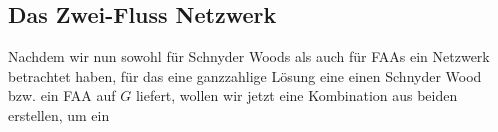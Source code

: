 

\subsection{Das Zwei-Fluss Netzwerk}

Nachdem wir nun sowohl für Schnyder Woods als auch für FAAs ein Netzwerk betrachtet haben, für das eine ganzzahlige Lösung eine einen Schnyder Wood bzw. ein FAA auf $G$ liefert, wollen wir jetzt eine Kombination aus beiden erstellen, um ein 

